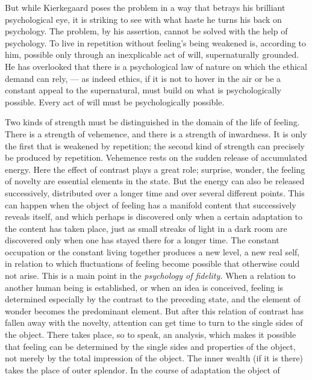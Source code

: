 \documentclass[12pt,a4paper,openany]{book}
\newcommand{\opage}[1]{\marginnote{\footnotesize\textit{[#1]}}}
\begin{document}
But while Kierkegaard poses the problem in a way that betrays his brilliant psychological
eye, it is striking
\setcounter{footnote}{0}%
\opage{233}to see with what haste he turns his back on psychology.
The problem, by his assertion, cannot be solved with the help of psychology. To live in
repetition without feeling's being weakened is, according to him, possible only through an
inexplicable act of will, supernaturally grounded. He has overlooked that there is a
psychological law of nature on which the ethical demand can rely, --- as indeed ethics,
if it is not to hover in the air or be a constant appeal to the supernatural, must build
on what is psychologically possible. Every act of will must be psychologically possible.

Two kinds of strength must be distinguished in the domain of the life of feeling. There
is a strength of vehemence, and there is a strength of inwardness. It is only the first
that is weakened by repetition; the second kind of strength can precisely be produced by
repetition. Vehemence rests on the sudden release of accumulated energy. Here the effect
of contrast plays a great role; surprise, wonder, the feeling of novelty are essential
elements in the state. But the energy can also be released successively, distributed over
a longer time and over several different points. This can happen when the object of
feeling has a manifold content that successively reveals itself, and which perhaps is
discovered only when a certain adaptation to the content has taken place, just as small
streaks of light in a dark room are discovered only when one has stayed there for a
longer time. The constant occupation or the constant living together produces a new
level, a new real self, in relation to which fluctuations of feeling become possible that
otherwise could not arise. This is a main point in the \textit{psychology of
fidelity.} When a relation to another human being is established, or when an idea is
conceived, feeling is determined especially by the contrast to the preceding state, and
the element of wonder becomes the predominant element. But after this relation of
contrast has fallen away with the novelty, attention can get time to turn to the single
sides of the object. There takes place, so to speak, an analysis, which
\setcounter{footnote}{0}%
\opage{234}makes it possible that feeling can be determined by the single sides and properties
of the object, not merely by the total impression of the object. The inner wealth (if it
is there) takes the place of outer splendor. In the course of adaptation the object of
\end{document}
